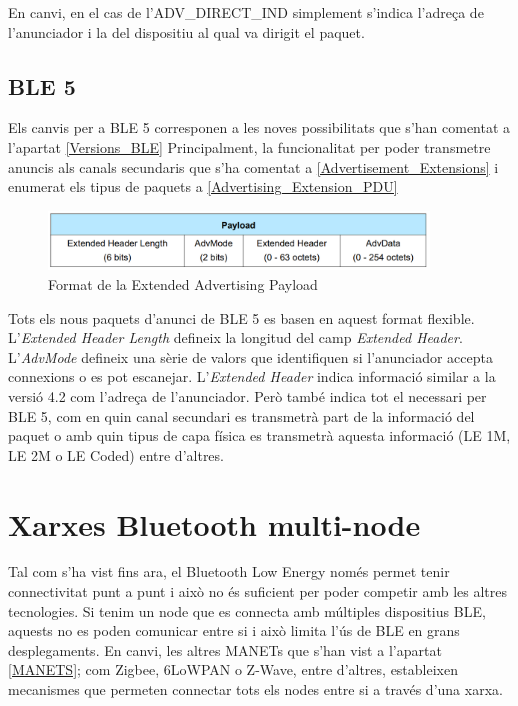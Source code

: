 En canvi, en el cas de l'ADV\_DIRECT\_IND simplement s'indica l'adreça de l'anunciador i la del dispositiu al qual va dirigit el paquet.

\subsection{BLE 5}
Els canvis per a BLE 5 corresponen a les noves possibilitats que s'han comentat a l'apartat \ref{Versions_BLE}
Principalment, la funcionalitat per poder transmetre anuncis als canals secundaris que s'ha comentat a \ref{Advertisement_Extensions} i enumerat els tipus de paquets a \ref{Advertising_Extension_PDU}

\begin{figure}[!h]
	\begin{center}
		\includegraphics[width=0.9\textwidth]{./images/Common_Extended_Advertising_Payload_Format.png}
		\caption{Format de la Extended Advertising Payload \cite{BLE_5_Extended_Advertising}}
	\end{center}
\end{figure}

Tots els nous paquets d'anunci de BLE 5 es basen en aquest format flexible.
L'\textit{Extended Header Length} defineix la longitud del camp \textit{Extended Header}.
L'\textit{AdvMode} defineix una sèrie de valors que identifiquen si l'anunciador accepta connexions o es pot escanejar.
L'\textit{Extended Header} indica informació similar a la versió 4.2 com l'adreça de l'anunciador.
Però també indica tot el necessari per BLE 5, com en quin canal secundari es transmetrà part de la informació del paquet o amb quin tipus de capa física es transmetrà aquesta informació (LE 1M, LE 2M o LE Coded) entre d'altres.

\section{Xarxes Bluetooth multi-node}
Tal com s'ha vist fins ara, el Bluetooth Low Energy només permet tenir connectivitat punt a punt i això no és suficient per poder competir amb les altres tecnologies.
Si tenim un node que es connecta amb múltiples dispositius BLE, aquests no es poden comunicar entre si i això limita l'ús de BLE en grans desplegaments.
En canvi, les altres MANETs que s'han vist a l'apartat \ref{MANETS}; com Zigbee, 6LoWPAN o Z-Wave, entre d'altres, estableixen mecanismes que permeten connectar tots els nodes entre si a través d'una xarxa.

